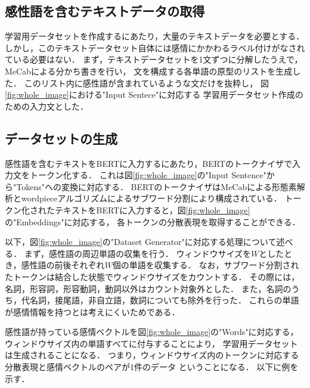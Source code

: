 		\subsection{感性語を含むテキストデータの取得}
			学習用データセットを作成するにあたり，大量のテキストデータを必要とする．
			しかし，このテキストデータセット自体には感情にかかわるラベル付けがなされている必要はない．
			まず，テキストデータセットを1文ずつに分解したうえで，MeCabによる分かち書きを行い，
			文を構成する各単語の原型のリストを生成した．
			このリスト内に感性語が含まれているような文だけを抜粋し，
			図\ref{fig:whole_image}における"Input Sentece"に対応する
			学習用データセット作成のための入力文とした．

		\subsection{データセットの生成}
			感性語を含むテキストをBERTに入力するにあたり，BERTのトークナイザで入力文をトークン化する．
			これは図\ref{fig:whole_image}の"Input Sentence"から"Tokens"への変換に対応する．
			BERTのトークナイザはMeCabによる形態素解析とwordpieceアルゴリズムによるサブワード分割により構成されている．
			トークン化されたテキストをBERTに入力すると，図\ref{fig:whole_image}の"Embeddings"に対応する，
			各トークンの分散表現を取得することができる．

			以下，図\ref{fig:whole_image}の"Dataset Generator"に対応する処理について述べる．
			まず，感性語の周辺単語の収集を行う．
			ウィンドウサイズを$W$としたとき，感性語の前後それぞれ$W$個の単語を収集する．
			なお，サブワード分割されたトークンは結合した状態でウィンドウサイズをカウントする．
			その際には，名詞，形容詞，形容動詞，動詞以外はカウント対象外とした．
			また，名詞のうち，代名詞，接尾語，非自立語，数詞についても除外を行った．
			これらの単語が感情情報を持つとは考えにくいためである．

			感性語が持っている感情ベクトルを図\ref{fig:whole_image}の"Words"に対応する，
			ウィンドウサイズ内の単語すべてに付与することにより，
			学習用データセットは生成されることになる．
			つまり，ウィンドウサイズ内のトークンに対応する分散表現と感情ベクトルのペアが1件のデータ
			ということになる．
			以下に例を示す．

